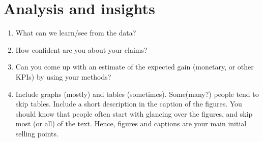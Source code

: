 \documentclass[report]{subfiles}
\begin{document}
\section{Analysis and insights}
\begin{enumerate}
\item What can we learn/see from the data?
\item How confident are you about your claims?
\item Can you come up with an estimate of the expected gain (monetary, or other KPIs) by using your methods?
\item Include graphs (mostly) and tables (sometimes).
  Some(many?)
  people tend to skip tables.
  Include a short description in the caption of the figures.
  You should know that people often start with glancing over the figures, and skip most (or all) of the text.
  Hence, figures and captions are your main initial selling points.
\end{enumerate}
\end{document}
